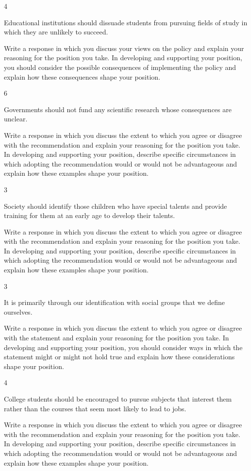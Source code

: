 \documentclass[]{article}
\begin{document}
4

Educational institutions should dissuade students from pursuing fields
of study in which they are unlikely to succeed.

Write a response in which you discuss your views on the policy and
explain your reasoning for the position you take. In developing and
supporting your position, you should consider the possible consequences
of implementing the policy and explain how these consequences shape your
position.

6

Governments should not fund any scientific research whose consequences
are unclear.

Write a response in which you discuss the extent to which you agree or
disagree with the recommendation and explain your reasoning for the
position you take. In developing and supporting your position, describe
specific circumstances in which adopting the recommendation would or
would not be advantageous and explain how these examples shape your
position.

3

Society should identify those children who have special talents and
provide training for them at an early age to develop their talents.

Write a response in which you discuss the extent to which you agree or
disagree with the recommendation and explain your reasoning for the
position you take. In developing and supporting your position, describe
specific circumstances in which adopting the recommendation would or
would not be advantageous and explain how these examples shape your
position.

3

It is primarily through our identification with social groups that we
define ourselves.

Write a response in which you discuss the extent to which you agree or
disagree with the statement and explain your reasoning for the position
you take. In developing and supporting your position, you should
consider ways in which the statement might or might not hold true and
explain how these considerations shape your position.

4

College students should be encouraged to pursue subjects that interest
them rather than the courses that seem most likely to lead to jobs.

Write a response in which you discuss the extent to which you agree or
disagree with the recommendation and explain your reasoning for the
position you take. In developing and supporting your position, describe
specific circumstances in which adopting the recommendation would or
would not be advantageous and explain how these examples shape your
position.
\end{document}

